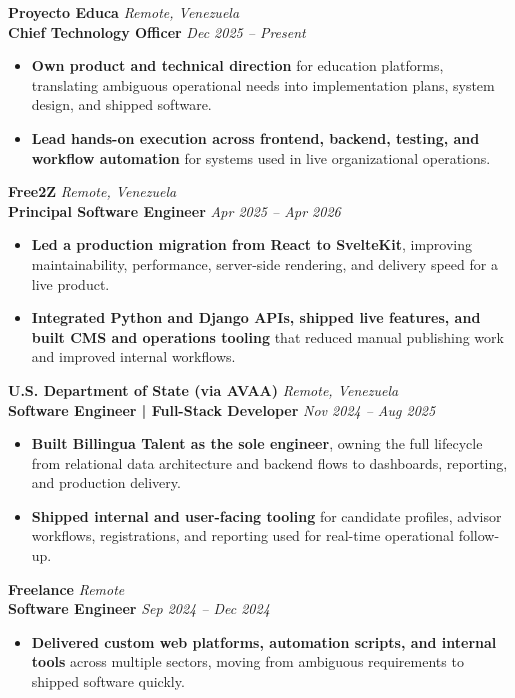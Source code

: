 \documentclass[11pt]{article}
\begin{document}
\textbf{Proyecto Educa} \hfill \textit{Remote, Venezuela} \\
\textbf{Chief Technology Officer} \hfill \textit{Dec 2025 -- Present}
\begin{itemize}
    \item \textbf{Own product and technical direction} for education platforms, translating ambiguous operational needs into implementation plans, system design, and shipped software.
    \item \textbf{Lead hands-on execution across frontend, backend, testing, and workflow automation} for systems used in live organizational operations.
\end{itemize}

\vspace{8pt}
\textbf{Free2Z} \hfill \textit{Remote, Venezuela} \\
\textbf{Principal Software Engineer} \hfill \textit{Apr 2025 -- Apr 2026}
\begin{itemize}
    \item \textbf{Led a production migration from React to SvelteKit}, improving maintainability, performance, server-side rendering, and delivery speed for a live product.
    \item \textbf{Integrated Python and Django APIs, shipped live features, and built CMS and operations tooling} that reduced manual publishing work and improved internal workflows.
\end{itemize}

\vspace{8pt}
\textbf{U.S. Department of State (via AVAA)} \hfill \textit{Remote, Venezuela} \\
\textbf{Software Engineer | Full-Stack Developer} \hfill \textit{Nov 2024 -- Aug 2025}
\begin{itemize}
    \item \textbf{Built Billingua Talent as the sole engineer}, owning the full lifecycle from relational data architecture and backend flows to dashboards, reporting, and production delivery.
    \item \textbf{Shipped internal and user-facing tooling} for candidate profiles, advisor workflows, registrations, and reporting used for real-time operational follow-up.
\end{itemize}

\vspace{8pt}
\textbf{Freelance} \hfill \textit{Remote} \\
\textbf{Software Engineer} \hfill \textit{Sep 2024 -- Dec 2024}
\begin{itemize}
    \item \textbf{Delivered custom web platforms, automation scripts, and internal tools} across multiple sectors, moving from ambiguous requirements to shipped software quickly.
\end{itemize}
\end{document}
